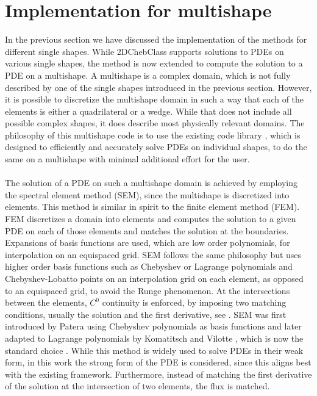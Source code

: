 \documentclass[11pt, a4paper]{article}
\theoremstyle{definition}
\begin{document}
\section{Implementation for multishape}
In the previous section we have discussed the implementation of the methods for different single shapes. While 2DChebClass supports solutions to PDEs on various single shapes, the method is now extended to compute the solution to a PDE on a multishape. A multishape is a complex domain, which is not fully described by one of the single shapes introduced in the previous section. However, it is possible to discretize the multishape domain in such a way that each of the elements is either a quadrilateral or a wedge. While that does not include all possible complex shapes, it does describe most physically relevant domains. The philosophy of this multishape code is to use the existing code library \cite{GoddardPseudospectralCode1}, which is designed to efficiently and accurately solve PDEs on individual shapes, to do the same on a multishape with minimal additional effort for the user.
\\
\\
The solution of a PDE on such a multishape domain is achieved by employing the spectral element method (SEM), since the multishape is discretized into elements. This method is similar in spirit to the finite element method (FEM). FEM discretizes a domain into elements and computes the solution to a given PDE on each of those elements and matches the solution at the boundaries. Expansions of basis functions are used, which are low order polynomials, for interpolation on an equispaced grid. SEM follows the same philosophy but uses higher order basis functions such as Chebyshev or Lagrange polynomials and Chebyshev-Lobatto points on an interpolation grid on each element, as opposed to an equispaced grid, to avoid the Runge phenomenon. At the intersections between the elements, $C^0$ continuity is enforced, by imposing two matching conditions, usually the solution and the first derivative, see \cite{Boyd1}. SEM was first introduced by Patera \cite{SEMPatera84} using  Chebyshev polynomials as basis functions and later adapted to Lagrange polynomials by Komatitsch and Vilotte \cite{SEMLagrange98}, which is now the standard choice \cite{Boyd1}.
While this method is widely used to solve PDEs in their weak form, in this work the strong form of the PDE is considered, since this aligns best with the existing framework. Furthermore, instead of matching the first derivative of the solution at the intersection of two elements, the flux is matched. 
\end{document}
